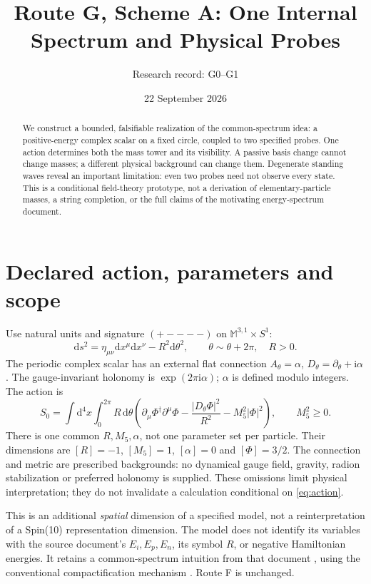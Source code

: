 \documentclass[11pt,a4paper]{article}
\title{Route G, Scheme A: One Internal Spectrum and Physical Probes}
\author{Research record: G0--G1}
\date{22 September 2026}
\newcommand{\dd}{\mathrm{d}}
\newcommand{\ii}{\mathrm{i}}
\begin{document}
\maketitle
\begin{abstract}
We construct a bounded, falsifiable realization of the common-spectrum
idea: a positive-energy complex scalar on a fixed circle, coupled to two
specified probes. One action determines both the mass tower and its
visibility. A passive basis change cannot change masses; a different
physical background can change them. Degenerate standing waves reveal
an important limitation: even two probes need not observe every state.
This is a conditional field-theory prototype, not a derivation of
elementary-particle masses, a string completion, or the full claims of
the motivating energy-spectrum document.
\end{abstract}

\section{Declared action, parameters and scope}
Use natural units and signature $(+----)$ on
$\mathbb M^{3,1}\times S^1$:
\begin{equation}
 \dd s^2=\eta_{\mu\nu}\dd x^\mu\dd x^\nu-R^2\dd\theta^2,\qquad
 \theta\sim\theta+2\pi,\quad R>0.
\end{equation}
The periodic complex scalar has an external flat connection
$A_\theta=\alpha$, $D_\theta=\partial_\theta+\ii\alpha$.
The gauge-invariant holonomy is $\exp(2\pi\ii\alpha)$; $\alpha$ is
defined modulo integers. The action is
\begin{equation}\label{eq:action}
 S_0=\int\dd^4x\int_0^{2\pi}R\,\dd\theta
 \left(\partial_\mu\Phi^\dagger\partial^\mu\Phi
 -\frac{|D_\theta\Phi|^2}{R^2}-M_5^2|\Phi|^2\right),
 \qquad M_5^2\geq0 .
\end{equation}
There is one common $R,M_5,\alpha$, not one parameter set per particle.
Their dimensions are $[R]=-1$, $[M_5]=1$, $[\alpha]=0$ and
$[\Phi]=3/2$. The connection and metric are prescribed backgrounds:
no dynamical gauge field, gravity, radion stabilization or preferred
holonomy is supplied. These omissions limit physical interpretation;
they do not invalidate a calculation conditional on \eqref{eq:action}.

This is an additional \emph{spatial} dimension of a specified model,
not a reinterpretation of a Spin(10) representation dimension.
The model does not identify its variables with the source document's
$E_i,E_p,E_n$, its symbol $R$, or negative Hamiltonian energies.
It retains a common-spectrum intuition from that document
\cite{chen}, using the conventional compactification mechanism
\cite{tong,yamada}. Route F is unchanged.
\end{document}
